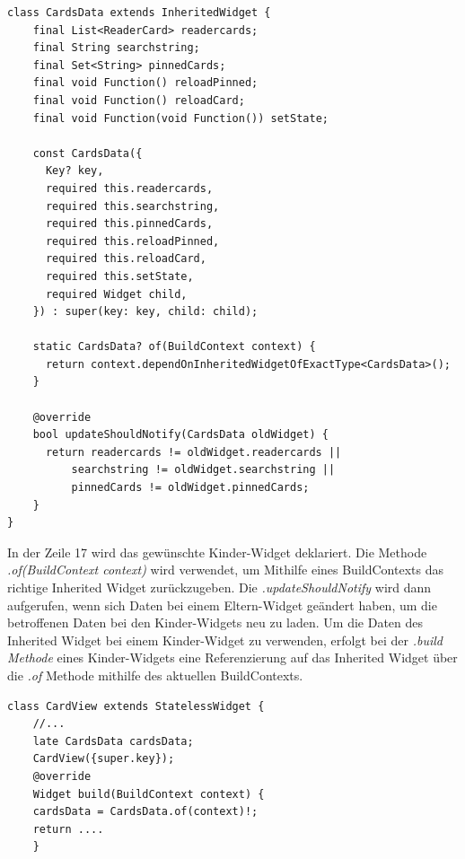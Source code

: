 \begin{lstlisting}[caption=Beispiel Inherited Klasse,style=goMono]
class CardsData extends InheritedWidget {
    final List<ReaderCard> readercards;
    final String searchstring;
    final Set<String> pinnedCards;
    final void Function() reloadPinned;
    final void Function() reloadCard;
    final void Function(void Function()) setState;
    
    const CardsData({
      Key? key,
      required this.readercards,
      required this.searchstring,
      required this.pinnedCards,
      required this.reloadPinned,
      required this.reloadCard,
      required this.setState,
      required Widget child,
    }) : super(key: key, child: child);
    
    static CardsData? of(BuildContext context) {
      return context.dependOnInheritedWidgetOfExactType<CardsData>();
    }
    
    @override
    bool updateShouldNotify(CardsData oldWidget) {
      return readercards != oldWidget.readercards ||
          searchstring != oldWidget.searchstring ||
          pinnedCards != oldWidget.pinnedCards;
    }
}
\end{lstlisting}

In der Zeile 17 wird das gewünschte Kinder-Widget deklariert. Die Methode {\textit{.of(BuildContext context)}} wird verwendet, um Mithilfe eines BuildContexts das richtige Inherited Widget zurückzugeben. Die {\textit{.updateShouldNotify}} wird dann aufgerufen, wenn sich Daten bei einem Eltern-Widget geändert haben, um die betroffenen Daten bei den Kinder-Widgets neu zu laden.
Um die Daten des Inherited Widget bei einem Kinder-Widget zu verwenden, erfolgt bei der {\textit{.build Methode}} eines Kinder-Widgets eine Referenzierung auf das Inherited Widget über die {\textit{.of}} Methode mithilfe des aktuellen BuildContexts.

\begin{lstlisting}[caption=Referenzierung auf das InheritedWidget \"uber .of Methode,style=goMono]
class CardView extends StatelessWidget {
    //...
    late CardsData cardsData;
    CardView({super.key});
    @override
    Widget build(BuildContext context) {
    cardsData = CardsData.of(context)!;
    return ....
    }
\end{lstlisting}

